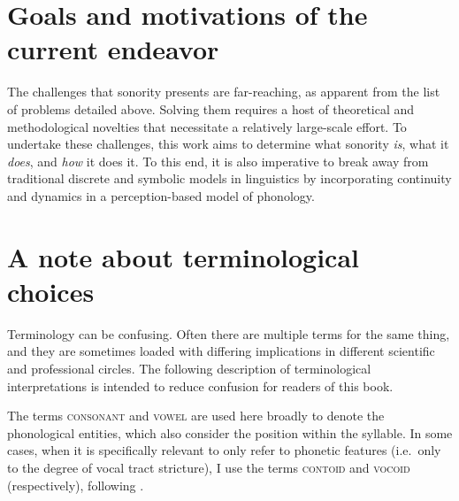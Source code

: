 \section{Goals and motivations of the current endeavor}\label{goals-and-motivations-of-the-current-endeavor}

The challenges that sonority presents are far-reaching, as apparent from the list of problems detailed above. Solving them requires a host of theoretical and methodological novelties that necessitate a relatively large-scale effort.
To undertake these challenges, this work aims to determine what sonority \emph{is}, what it \emph{does}, and \emph{how} it does it. To this end, it is also imperative to break away from traditional discrete and symbolic models in linguistics by incorporating continuity and dynamics in a perception-based model of phonology.



\section{A note about terminological choices}\label{a-note-about-terminological-choices}

Terminology can be confusing.
Often there are multiple terms for the same thing, and they are sometimes loaded with differing implications in different scientific and professional circles.
The following description of terminological interpretations is intended to reduce confusion for readers of this book.

The terms \textsc{consonant} and \textsc{vowel} are used here broadly to denote the phonological entities, which also consider the position within the syllable. In some cases, when it is specifically relevant to only refer to phonetic features (i.e.~only to the degree of vocal tract stricture), I use the terms \textsc{contoid} and \textsc{vocoid} (respectively), following \citet{pike1943phonetics}.

